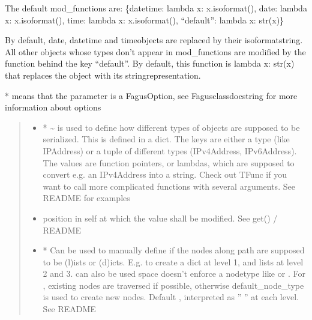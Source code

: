 \documentclass[a4paper,10pt,english]{sphinxmanual}
\begin{document}
\begin{fulllineitems}
\begin{fulllineitems}
\sphinxAtStartPar
The default mod\_functions are: \{datetime: lambda x: x.isoformat(), date: lambda x: x.isoformat(), time:
lambda x: x.isoformat(), “default”: lambda x: str(x)\}

\sphinxAtStartPar
By default, date, datetime and time\sphinxhyphen{}objects are replaced by their isoformat\sphinxhyphen{}string. All other objects whose
types don’t appear in mod\_functions are modified by the function behind the key “default”. By default, this
function is lambda x: str(x) that replaces the object with its string\sphinxhyphen{}representation.

\sphinxAtStartPar
* means that the parameter is a FagusOption, see Fagus\sphinxhyphen{}class\sphinxhyphen{}docstring for more information about options
\begin{quote}\begin{description}
\begin{itemize}
\item {}
\sphinxAtStartPar
{} \textendash{} * \textasciitilde{} is used to define how different types of objects are supposed to be serialized. This is
defined in a dict. The keys are either a type (like IPAddress) or a tuple of different types
(IPv4Address, IPv6Address). The values are function pointers, or lambdas, which are supposed to convert
e.g. an IPv4Address into a string. Check out TFunc if you want to call more complicated functions with
several arguments. See README for examples

\item {}
\sphinxAtStartPar
{} \textendash{} position in self at which the value shall be modified. See get() / README

\item {}
\sphinxAtStartPar
{} \textendash{} * Can be used to manually define if the nodes along path are supposed to be (l)ists or
(d)icts. E.g.  to create a dict at level 1, and lists at level 2 and 3.  can also be
used \textendash{} space doesn’t enforce a node\sphinxhyphen{}type like  or . For , existing nodes are
traversed if possible, otherwise default\_node\_type is used to create new nodes. Default ,
interpreted as ” ” at each level. See README


\end{itemize}
\end{description}
\end{quote}
\end{fulllineitems}
\end{fulllineitems}
\end{document}
